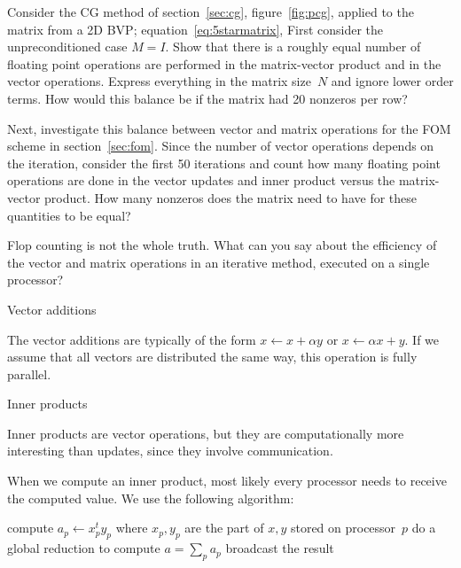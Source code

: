 \begin{exercise}
  Consider the \ac{CG} method of section~\ref{sec:cg},
  figure~\ref{fig:pcg}, applied to the
  matrix from a 2D \ac{BVP}; equation~\eqref{eq:5starmatrix}, First
  consider the unpreconditioned case $M=I$. Show that there is a
  roughly equal number of floating point
  operations are performed in the matrix-vector product and 
  in the vector operations. Express everything in the matrix size~$N$ and
  ignore lower order terms. How would this balance be if the matrix
  had 20 nonzeros per row?

  Next, investigate this balance between vector and matrix operations
  for the \ac{FOM} scheme in section~\ref{sec:fom}. Since the number
  of vector operations depends on the iteration, consider the first 50
  iterations and count how many floating point operations are done in
  the vector updates and inner product versus the matrix-vector
  product. How many nonzeros does the matrix need to have for these
  quantities to be equal?
\end{exercise}

\begin{exercise}
  Flop counting is not the whole truth. What can you say about the
  efficiency of the vector and matrix operations in an iterative
  method, executed on a single processor?
\end{exercise}

 {Vector additions}

The vector additions are
typically of the form $x\leftarrow x+\alpha y$ or $x\leftarrow \alpha x+y$.
If we assume that all vectors are distributed the same way, this
operation is fully parallel.

 {Inner products}

Inner products are vector operations, but they are computationally
more interesting than updates, since they involve communication. 

When we compute an inner product, most likely 
every processor needs to receive the computed value. We
use the following algorithm:

\begin{displayalgorithm}
   {
    compute $a_p\leftarrow x_p^ty_p$ where $x_p,y_p$ are the part of
    $x,y$ stored on processor~$p$ }
    do a global reduction to compute $a=\sum_p a_p$ \;
    broadcast the result
  \caption{Compute $a\leftarrow x^ty$ where $x,y$ are distributed vectors}
\end{displayalgorithm}

